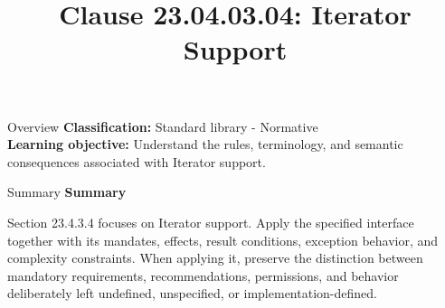 \documentclass[10pt,letterpaper]{article}
\title{Clause 23.04.03.04: Iterator Support}
\author{}
\date{}
\begin{document}
\maketitle
\begin{CornellOverviewBox}{Overview}
\textbf{Classification:} Standard library - Normative\\[2pt]
\textbf{Learning objective:} Understand the rules, terminology, and semantic consequences associated with Iterator support.
\end{CornellOverviewBox}\begin{CornellSummaryBox}{Summary}
{\sffamily\bfseries\color{Accent} Summary}\par\vspace{3pt}Section 23.4.3.4 focuses on Iterator support. Apply the specified interface together with its mandates, effects, result conditions, exception behavior, and complexity constraints. When applying it, preserve the distinction between mandatory requirements, recommendations, permissions, and behavior deliberately left undefined, unspecified, or implementation-defined.
\end{CornellSummaryBox}
\end{document}
